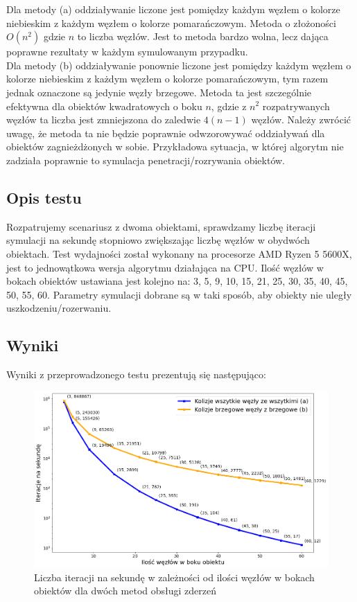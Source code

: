 \documentclass[12pt, letterpaper]{report}
\begin{document}
    Dla metody (a) oddziaływanie liczone jest pomiędzy każdym węzłem o kolorze niebieskim z każdym węzłem o
    kolorze pomarańczowym. Metoda o złożoności $O(n^2)$ gdzie $n$ to liczba węzłów.
    Jest to metoda bardzo wolna, lecz dająca poprawne rezultaty w każdym symulowanym przypadku.\\

    Dla metody (b) oddziaływanie ponownie liczone jest pomiędzy każdym węzłem o kolorze niebieskim z każdym
    węzłem o kolorze pomarańczowym, tym razem jednak oznaczone są jedynie węzły brzegowe.
    Metoda ta jest szczególnie efektywna dla obiektów kwadratowych o boku $n$, gdzie z $n^2$
    rozpatrywanych węzłów ta liczba jest zmniejszona do zaledwie $4(n-1)$ węzłów.
    Należy zwrócić uwagę, że metoda ta nie będzie poprawnie odwzorowywać oddziaływań dla
    obiektów zagnieżdżonych w sobie. Przykładowa sytuacja, w której algorytm nie zadziała poprawnie
    to symulacja penetracji/rozrywania obiektów.

    \subsection{Opis testu}
    Rozpatrujemy scenariusz z dwoma obiektami, sprawdzamy liczbę iteracji symulacji na sekundę stopniowo
    zwiększając liczbę węzłów w obydwóch obiektach.
    Test wydajności został wykonany na procesorze AMD Ryzen 5 5600X, 
    jest to jednowątkowa wersja algorytmu działająca na CPU.
    Ilość węzłów w bokach obiektów ustawiana jest kolejno na: 
    3, 5, 9, 10, 15, 21, 25, 30, 35, 40, 45, 50, 55, 60. Parametry symulacji dobrane są 
    w taki sposób, aby obiekty nie uległy uszkodzeniu/rozerwaniu.
    
    \subsection{Wyniki}
    Wyniki z przeprowadzonego testu prezentują się następująco:
    \begin{figure}[H]
        \centering
        \includegraphics[width=15cm]{performance_side_size}
        \caption{
            Liczba iteracji na sekundę w zależności od 
            ilości węzłów w bokach obiektów dla dwóch metod obsługi zderzeń
        }
    \end{figure}
\end{document}
